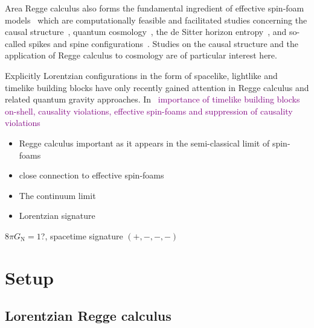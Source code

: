\documentclass[amsmath,amssymb,aps,twocolumn,superscriptaddress,nofootinbib]{revtex4-1}
\newcommand{\caj}[1]{\textcolor{purple}{#1}}
\newcommand{\GN}{G_{\mathrm{N}}}
\begin{document}
Area Regge calculus also forms the fundamental ingredient of effective spin-foam models~\cite{Asante:2020qpa,Asante:2020iwm,Asante:2021phx,Asante:2021zzh,Jercher:2024hlr} which are computationally feasible and facilitated studies concerning the causal structure~\cite{Asante:2025qbr}, quantum cosmology~\cite{Dittrich:2023rcr}, the de Sitter horizon entropy~\cite{Dittrich:2024awu}, and so-called spikes and spine configurations~\cite{Borissova:2024pfq,Borissova:2024txs}.
Studies on the causal structure and the application of Regge calculus to cosmology are of particular interest here.

Explicitly Lorentzian configurations in the form of spacelike, lightlike and timelike building blocks have only recently gained attention in Regge calculus and related quantum gravity approaches. 
In~\cite{Dittrich:2021gww,Jercher:2023csk} \caj{importance of timelike building blocks on-shell, causality violations, effective spin-foams and suppression of causality violations}




\begin{itemize}
  \item Regge calculus important as it appears in the semi-classical limit of spin-foams
  \item close connection to effective spin-foams
  \item The continuum limit
  \item Lorentzian signature
\end{itemize}

$8\pi\GN = 1$?, spacetime signature $(+,-,-,-)$

\section{Setup}

\subsection{Lorentzian Regge calculus}
\end{document}
